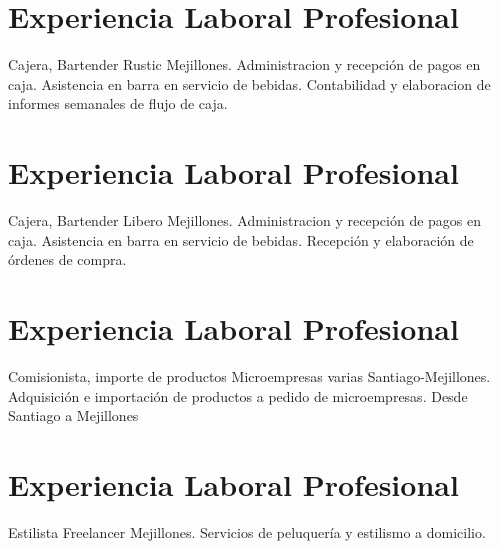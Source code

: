 \documentclass[draft,color,12pt,letterpaper,sans]{moderncv}
\title{}
\begin{document}
\makecvtitle %

\section{Experiencia Laboral Profesional}
{Cajera, Bartender}
{\newline Rustic}
{\newline Mejillones.}
{}
{Administracion y recepción de pagos en caja. 
\newline Asistencia en barra en servicio de bebidas. 
\newline Contabilidad y elaboracion de informes semanales de flujo de caja.}

\section{Experiencia Laboral Profesional}
{Cajera, Bartender}
{\newline Libero}
{\newline Mejillones.}
{}
{Administracion y recepción de pagos en caja. 
\newline Asistencia en barra en servicio de bebidas. 
\newline Recepción y elaboración de órdenes de compra.}

\section{Experiencia Laboral Profesional}
{Comisionista, importe de productos}
{\newline Microempresas varias}
{\newline Santiago-Mejillones.}
{}
{Adquisición e importación de productos a pedido de microempresas. Desde Santiago a Mejillones \newline}

\section{Experiencia Laboral Profesional}
{Estilista}
{\newline Freelancer}
{\newline Mejillones.}
{}
{Servicios de peluquería y estilismo a domicilio.}


\end{document}
